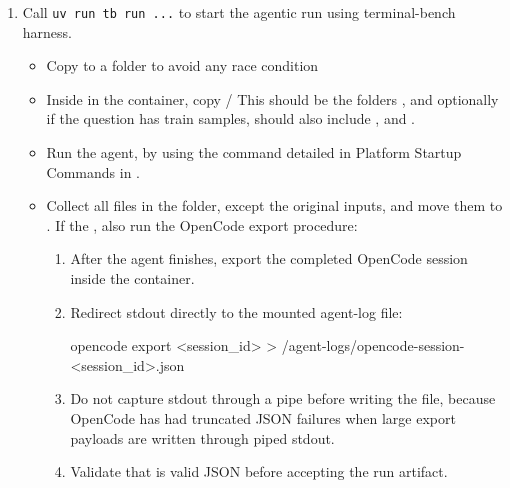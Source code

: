 \documentclass[11pt]{article}
\begin{document}
\begin{enumerate}
\begin{itemize}
\begin{DocCode}
      {
        "17a033a89614421b8bb520c3bb286b60.parquet": {[...]},
        "1b4abf9677a956e4bb90051b4494f4b3.parquet": {[...]}
      }
    \end{DocCode}
  \end{itemize}
  \item Call \verb|uv run tb run ...| to start the agentic run using terminal-bench harness.
  \begin{itemize} 
    \item Copy  to a  folder to avoid any race condition
    \item Inside  in the container, copy /
    This should be the folders , and optionally if the question has train samples, should also include , and .
    \item Run the agent, by using the command detailed in Platform Startup Commands in .
    \item Collect all files in the  folder, except the original inputs, and move them to .
    If the , also run the OpenCode export procedure:
    \begin{enumerate}
      \item After the agent finishes, export the completed OpenCode session inside the container.
      \item Redirect stdout directly to the mounted agent-log file:
      \begin{DocCode}
opencode export <session_id> > /agent-logs/opencode-session-<session_id>.json
      \end{DocCode}
      \item Do not capture  stdout through a pipe before writing the file, because OpenCode has had truncated JSON failures when large export payloads are written through piped stdout.
      \item Validate that  is valid JSON before accepting the run artifact.
    \end{enumerate}


\end{itemize}
\end{enumerate}
\end{document}
